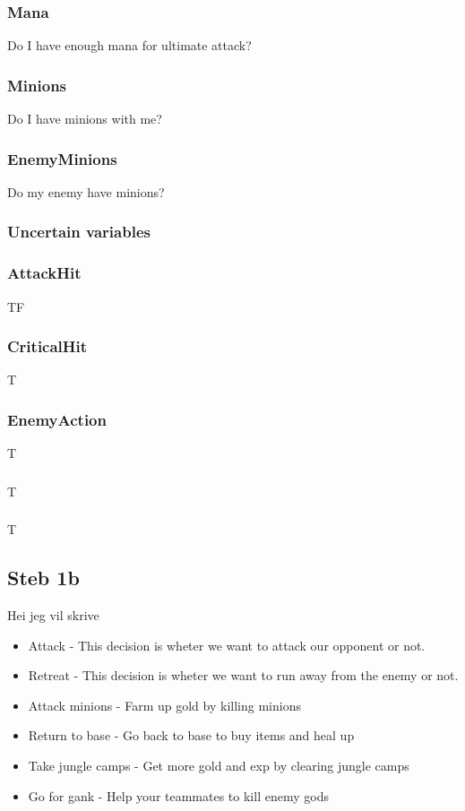 \documentclass[titlepage]{article}
\begin{document}
\subsubsection*{Mana}
Do I have enough mana for ultimate attack? 

\subsubsection*{Minions}
Do I have minions with me?

\subsubsection*{EnemyMinions}
Do my enemy have minions?




\subsubsection{Uncertain variables}
\subsubsection*{AttackHit}
TF

\subsubsection*{CriticalHit}
T

\subsubsection*{EnemyAction}
T


\subsubsection*{}
T

\subsubsection*{}
T

\subsection{Steb 1b}
Hei jeg vil skrive
\begin{itemize}
\item Attack - This decision is wheter we want to attack our opponent or not.
\item Retreat - This decision is wheter we want to run away from the enemy or not.
\item Attack minions  - Farm up gold by killing minions
\item Return to base - Go back to base to buy items and heal up
\item Take jungle camps - Get more gold and exp by clearing jungle camps
\item Go for gank - Help your teammates to kill enemy gods

\end{itemize}
\end{document}
